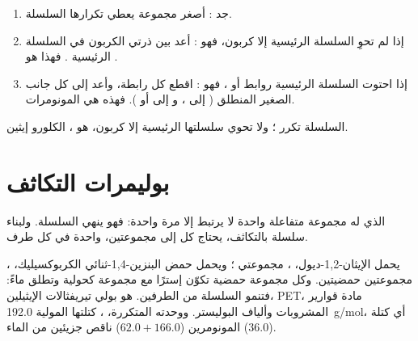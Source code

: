 \begin{method}\label{met:g12:polymers:monomer}
\begin{enumerate}
  \item جد : أصغر مجموعة يعطي تكرارها
        السلسلة.
  \item إذا لم تحوِ السلسلة الرئيسية إلا  كربون، فهو : أعد  بين ذرتي الكربون في
        السلسلة الرئيسية . فهذا هو .
  \item إذا احتوت السلسلة الرئيسية روابط  أو ، فهو
        : اقطع كل رابطة، وأعد إلى كل جانب
          الصغير المنطلق ( إلى
        ، و إلى  أو ). فهذه هي
        المونومرات.
\end{enumerate}
\end{method}

\begin{example}\label{ex:g12:polymers:pvc}
السلسلة  تكرر ؛
ولا تحوي سلسلتها الرئيسية إلا  كربون،  هو
، الكلورو إيثين.
\end{example}

\section{بوليمرات التكاثف}

 الذي له مجموعة متفاعلة واحدة لا يرتبط إلا مرة واحدة: فهو ينهي السلسلة.
ولبناء سلسلة بالتكاثف، يحتاج كل  إلى مجموعتين، واحدة في
كل طرف.

\begin{example}\label{ex:g12:polymers:pet}
يحمل الإيثان-1,2-ديول، ، مجموعتي ؛
ويحمل حمض البنزين-1,4-ثنائي الكربوكسيليك، ، مجموعتين حمضيتين. وكل
مجموعة حمضية تكوّن إسترًا مع مجموعة كحولية وتطلق ماءً: فتنمو
السلسلة من الطرفين.  هو بولي تيريفثالات الإيثيلين،
PET، مادة قوارير المشروبات وألياف البوليستر. ووحدته المتكررة،
، كتلتها المولية \qty{192.0}{g/mol}، أي كتلة
المونومرين ($62.0 + 166.0$) ناقص جزيئين من الماء ($36.0$).
\end{example}

